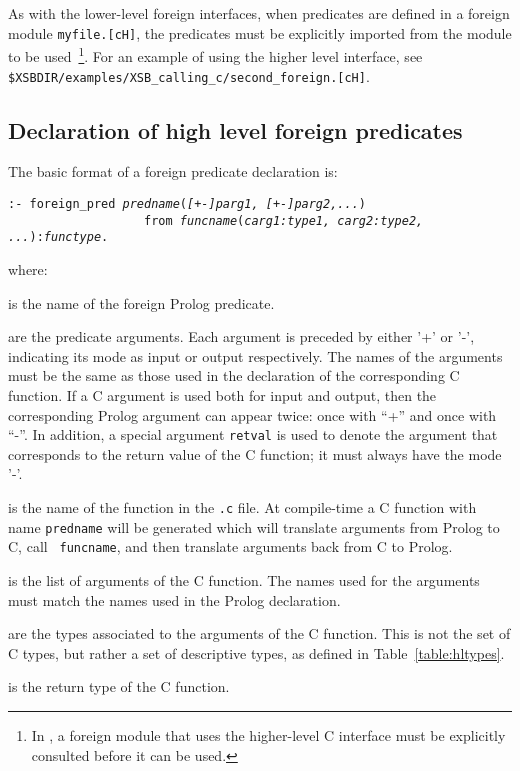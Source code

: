 As with the lower-level foreign interfaces, when predicates are
defined in a foreign module {\verb|myfile.[cH]|}, the predicates must
be explicitly imported from the module to be used~\footnote{In
  \version , a foreign module that uses the higher-level C interface
  must be explicitly consulted before it can be used.}.  For an
example of using the higher level interface, see {\tt
  \$XSBDIR/examples/XSB\_calling\_c/second\_foreign.[cH]}.

\subsection{Declaration of high level foreign predicates}

The basic format of a foreign predicate declaration is:
\begin{center}
{\tt :- foreign\_pred \emph{predname}(\emph{[+-]parg1,
  [+-]parg2,...})\\
~~~~~~~~~~~~~~~~~~~from \emph{funcname}(\emph{carg1:type1, carg2:type2,
  ...}):\emph{functype}.
}
\end{center}
where:

\begin{description}

 is the name of the foreign Prolog predicate. 

 are the predicate arguments. Each argument
is preceded by either '+' or '-', indicating its mode as input or
output respectively. The names of the arguments must be the same as
those used in the declaration of the corresponding C function. If a C
argument is used both for input and output, then the corresponding
Prolog argument can appear twice: once with ``+'' and once with ``-''.
In addition, a special argument \texttt{retval} is used to denote the
argument that corresponds to the return value of the C function; it
must always have the mode '-'.

 is the name of the function in the {\tt .c} file.
At compile-time a C function with name {\tt predname} will be
generated which will translate arguments from Prolog to C, call {\tt
  funcname}, and then translate arguments back from C to Prolog.

 is the list of arguments of the C
function. The names used for the arguments must match the names used
in the Prolog declaration.

 are the types associated to the arguments of
the C function. This is not the set of C types, but rather a set of
descriptive types, as defined in Table~\ref{table:hltypes}.

 is the return type of the C function.

\end{description}

